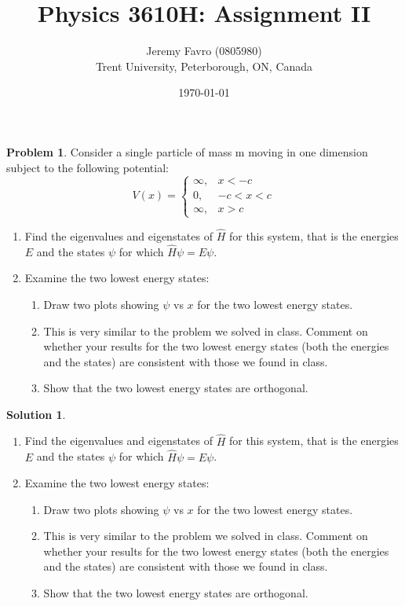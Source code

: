 \documentclass[10pt]{article}
\title{Physics 3610H: Assignment II}
\author{Jeremy Favro (0805980) \\ Trent University, Peterborough, ON, Canada}
\date{\today}
\theoremstyle{definition}
\newtheorem{problem}{Problem}
\newtheorem{soln}{Solution}
\begin{document}
\maketitle

\begin{problem} Consider a single particle of mass m moving in one dimension subject to the following
potential:
$$
  V(x)=\begin{cases}
    \infty, & x<-c   \\
    0,      & -c<x<c \\
    \infty, & x>c
  \end{cases}
$$
\begin{enumerate}[label=(\alph*)]
  \item Find the eigenvalues and eigenstates of $\hat{H}$ for this system, that is the energies $E$ and the
        states $\psi$ for which $\hat{H}\psi=E\psi$.
  \item Examine the two lowest energy states:
        \begin{enumerate}[label=(\roman*)]
          \item Draw two plots showing $\psi$ vs $x$ for the two lowest energy states.
          \item This is very similar to the problem we solved in class. Comment on whether your results
                for the two lowest energy states (both the energies and the states) are consistent with those
                we found in class.
          \item Show that the two lowest energy states are orthogonal.
        \end{enumerate}
\end{enumerate}
\end{problem}
\begin{soln}~
  \begin{enumerate}[label=(\alph*)]
    \item Find the eigenvalues and eigenstates of $\hat{H}$ for this system, that is the energies $E$ and the
          states $\psi$ for which $\hat{H}\psi=E\psi$.
    \item Examine the two lowest energy states:
          \begin{enumerate}[label=(\roman*)]
            \item Draw two plots showing $\psi$ vs $x$ for the two lowest energy states.
            \item This is very similar to the problem we solved in class. Comment on whether your results
                  for the two lowest energy states (both the energies and the states) are consistent with those
                  we found in class.
            \item Show that the two lowest energy states are orthogonal.
          \end{enumerate}
  \end{enumerate}
\end{soln}
\end{document}
